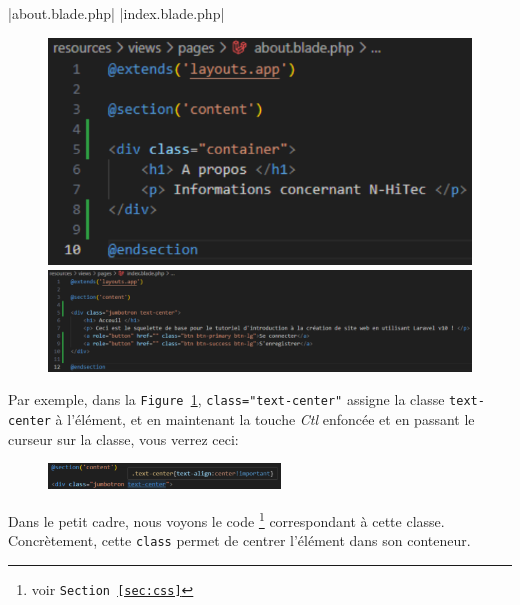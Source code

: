 \documentclass[internal]{nhitec_design}
\begin{document}
|about.blade.php|
|index.blade.php|
\begin{figure}[!ht]
    \centering
    \begin{minipage}{0.28\textwidth}
         \centering
         \includegraphics[width=\textwidth]{figures-C1/about_bs.pdf}
         \caption{\\\hspace{\textwidth} \protect{}}
    \end{minipage}
    \begin{minipage}{0.7\textwidth}
         \centering
         \includegraphics[width=\textwidth]{figures-C1/index_bs.pdf}
         \caption{\protect{}\label{fig:index_bs}}
    \end{minipage}
\end{figure}

Par exemple, dans la \texttt{Figure~\ref{fig:index_bs}}, \verb|class="text-center"| assigne la classe \verb|text-center| à l'élément, et en maintenant la touche \textit{Ctl} enfoncée et en passant le curseur sur la classe, vous verrez ceci:

\begin{figure}
    \vspace{-0.5cm}
    \includegraphics[width=0.55\textwidth]{figures-C1/see_class.pdf}
\end{figure}
Dans le petit cadre, nous voyons le code \css{}\footnote{voir \texttt{Section~\ref{sec:css}}} correspondant à cette classe. Concrètement, cette \verb|class| permet de centrer l'élément dans son conteneur.
\end{document}
